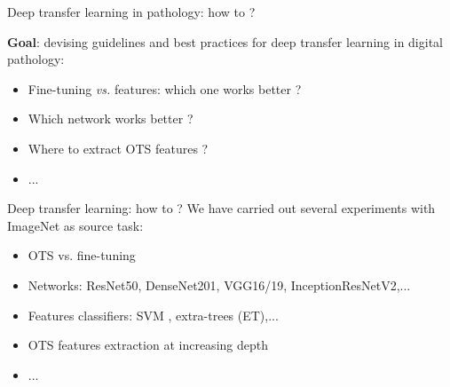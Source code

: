 \documentclass{beamer}
\begin{document}
\begin{frame}{Deep transfer learning in pathology: how to ?}

\textbf{Goal}: devising {guidelines and best practices} for deep transfer learning in digital pathology:
\vfill

\begin{itemize}
	\item {Fine-tuning \textit{vs.}  features}: which one works better ? 
 	\item Which {network} works better ? 
 	\item {Where to extract} OTS features ? 
 	\item ...
\end{itemize} 
\end{frame}



\begin{frame}{Deep transfer learning: how to ?}
\vfill
We have carried out {several experiments} with {ImageNet} as source task:
\vfill
\begin{itemize}
	 \item {OTS} vs. {fine-tuning}
	 \item {Networks}: ResNet50, DenseNet201, VGG16/19, InceptionResNetV2,...
	 \item {Features classifiers}: SVM , extra-trees (ET),...
	 \item OTS features extraction at {increasing depth}
	 \item ...
\end{itemize}
\vfill
\end{frame}
\end{document}
